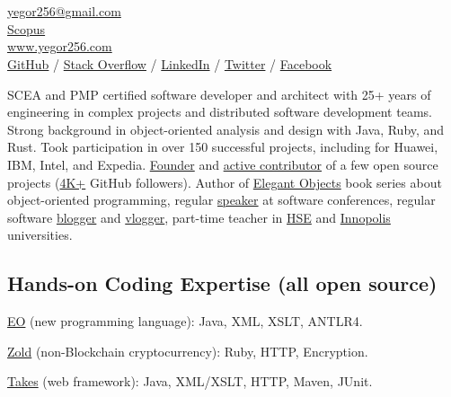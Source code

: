 \documentclass{yb}
\begin{document}
\ybPrintPhoto{}

\section*{\Large {}}

\href{mailto:yegor256@gmail.com}{yegor256@gmail.com}\\%
\href{https://www.scopus.com/authid/detail.uri?authorId=30367443600}{Scopus}\\%
\href{https://www.yegor256.com}{www.yegor256.com}\\%
\href{https://github.com/yegor256}{GitHub} /
\href{https://stackexchange.com/users/63162/yegor256}{Stack Overflow} /
\href{https://www.linkedin.com/in/yegor256}{LinkedIn} /
\href{https://twitter.com/intent/follow?screen_name=yegor256}{Twitter} /
\href{https://www.facebook.com/yegor256}{Facebook}

\vspace*{12pt}

SCEA and PMP certified software developer and architect with
25+ years of engineering in complex projects and distributed software
development teams. Strong background in object-oriented analysis and design
with Java, Ruby, and Rust. Took participation in over 150 successful projects,
including for Huawei, IBM, Intel, and Expedia. \href{https://www.yegor256.com/pets.html}{Founder}
and \href{https://github.com/yegor256}{active contributor} of
a few open source projects (\href{https://github.com/yegor256}{4K+} GitHub followers). Author of
\href{https://www.yegor256.com/elegant-objects.html}{Elegant Objects}
book series about object-oriented programming,
regular \href{https://www.yegor256.com/talks.html}{speaker} at software conferences, regular software
\href{https://www.yegor256.com}{blogger} and \href{https://www.youtube.com/c/yegor256}{vlogger},
part-time teacher in \href{https://www.hse.ru/en/}{HSE} and \href{https://innopolis.university/en/}{Innopolis} universities.

\subsection*{Hands-on Coding Expertise (all open source)}

\href{https://www.eolang.org}{EO} (new programming language):
Java, XML, XSLT, ANTLR4.

\href{https://www.zold.io}{Zold} (non-Blockchain cryptocurrency):
Ruby, HTTP, Encryption.

\href{https://www.takes.org}{Takes} (web framework):
Java, XML/XSLT, HTTP, Maven, JUnit.
\end{document}
